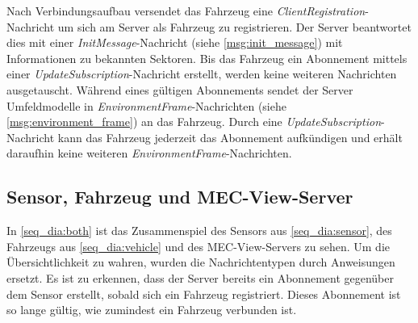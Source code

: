Nach Verbindungsaufbau versendet das Fahrzeug eine \textit{ClientRegistration}-Nachricht um sich am Server als Fahrzeug zu registrieren.
Der Server beantwortet dies mit einer \textit{InitMessage}-Nachricht (siehe \autoref{msg:init_message}) mit Informationen zu bekannten Sektoren.
Bis das Fahrzeug ein Abonnement mittels einer \textit{UpdateSubscription}-Nachricht erstellt, werden keine weiteren Nachrichten ausgetauscht.
Während eines gültigen Abonnements sendet der Server Umfeldmodelle in \textit{EnvironmentFrame}-Nachrichten (siehe \autoref{msg:environment_frame}) an das Fahrzeug.
Durch eine \textit{UpdateSubscription}-Nachricht kann das Fahrzeug jederzeit das Abonnement aufkündigen und erhält daraufhin keine weiteren \textit{EnvironmentFrame}-Nachrichten.

\subsection{Sensor, Fahrzeug und MEC-View-Server}

In \autoref{seq_dia:both} ist das Zusammenspiel des Sensors aus \autoref{seq_dia:sensor}, des Fahrzeugs aus \autoref{seq_dia:vehicle} und des MEC-View-Servers zu sehen.
Um die Übersichtlichkeit zu wahren, wurden die Nachrichtentypen durch Anweisungen ersetzt.
Es ist zu erkennen, dass der Server bereits ein Abonnement gegenüber dem Sensor erstellt, sobald sich ein Fahrzeug registriert.
Dieses Abonnement ist so lange gültig, wie zumindest ein Fahrzeug verbunden ist.

\vspace*{\fill}
\null

